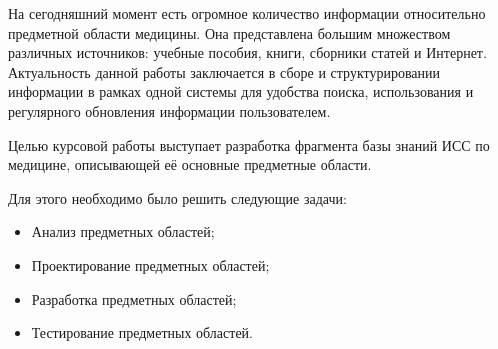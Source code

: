 \label{sec:intro}
На сегодняшний момент есть огромное количество информации относительно предметной области медицины. Она представлена большим множеством различных источников: учебные пособия, книги, сборники статей и Интернет. Актуальность данной работы заключается в сборе и структурировании информации в рамках одной системы для удобства поиска, использования и регулярного обновления информации пользователем.

Целью курсовой работы выступает разработка фрагмента базы знаний ИСС по медицине, описывающей её основные предметные области.

Для этого необходимо было решить следующие задачи:

\begin{itemize}	
	\item{Анализ предметных областей;}
	\item{Проектирование предметных областей;}
	\item{Разработка предметных областей;}
	\item{Тестирование предметных областей.}
\end{itemize}

